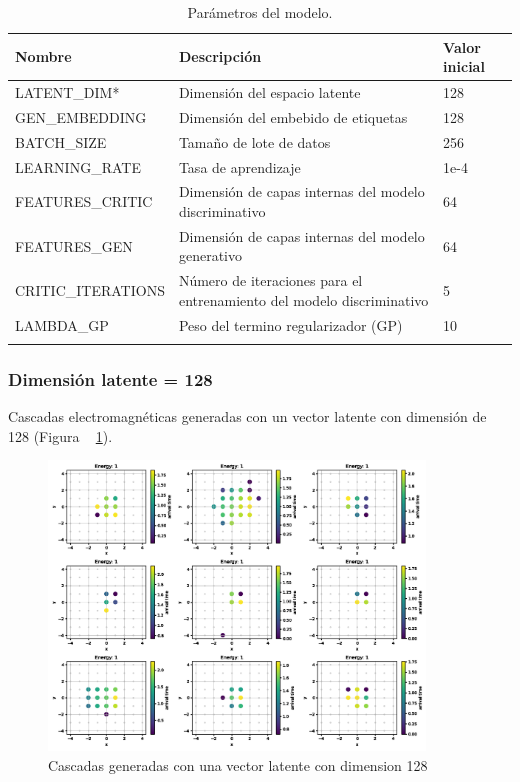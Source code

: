 \begin{table}
    \caption{Parámetros del modelo.}
    \label{tab:modelhyperparameters}
    \raggedleft
    \begin{tabular}{l l l}
        \toprule
        \textbf{Nombre} & \textbf{Descripción} & \textbf{Valor inicial} \\
        \midrule
        LATENT\_DIM*    & Dimensión del espacio latente    & 128\\
        GEN\_EMBEDDING    & Dimensión del embebido de etiquetas   & 128\\
        BATCH\_SIZE   & Tamaño de lote de datos   & 256\\
        LEARNING\_RATE    &  Tasa de aprendizaje  & 1e-4\\
        FEATURES\_CRITIC    & Dimensión de capas internas del modelo discriminativo & 64\\
        FEATURES\_GEN    & Dimensión de capas internas del modelo generativo & 64\\
        CRITIC\_ITERATIONS   & Número de iteraciones para el entrenamiento del modelo discriminativo  & 5\\
        LAMBDA\_GP   & Peso del termino regularizador (GP)  & 10\\
        \bottomrule\\
    \end{tabular}
\end{table}

\subsubsection*{Dimensión latente = 128}

Cascadas electromagnéticas generadas con un vector latente con dimensión de 128  (Figura ~ \ref{fig:ld128r0fakeshower}).

\begin{figure}
    \centering
    \includegraphics[width=100mm,scale=0.5]{Figures/res/CWGANGP_LD128_R0/fake.png}
    \decoRule
    \caption[Cascadas generadas 0]{
        Cascadas generadas con una vector latente con dimension 128
    }
    \label{fig:ld128r0fakeshower}
\end{figure}

